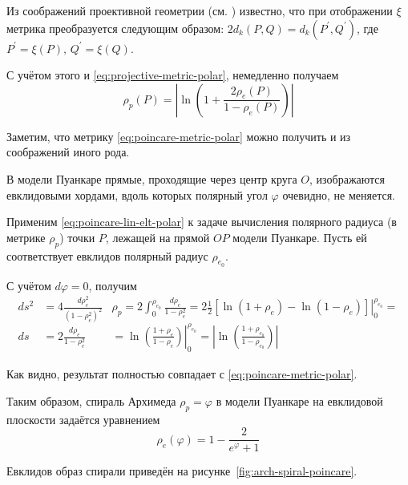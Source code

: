 \documentclass{article}
\numberwithin{equation}{section}
\renewcommand{\phi}{\varphi}
\providecommand{\abs}[1]{\left \lvert{#1}\right \rvert}
\begin{document}


Из соображений проективной геометрии (см. \cite{prasolov04}) известно,
что при отображении $\xi$ метрика преобразуется следующим образом:
$2d_k(P,Q) = d_k(P^\prime, Q^\prime)$, где $P^\prime=\xi(P),\,Q^\prime=\xi(Q)$.

С учётом этого и \eqref{eq:projective-metric-polar}, немедленно получаем
\begin{equation}\label{eq:poincare-metric-polar}
 \rho_p(P) = \abs{\ln\left(1+\frac{2\rho_e(P)}{1-\rho_e(P)}\right)}  
\end{equation}

Заметим, что метрику \eqref{eq:poincare-metric-polar} можно
получить и из соображений иного рода.

В модели Пуанкаре прямые, проходящие через центр круга $O$,
изображаются евклидовыми хордами, вдоль которых полярный угол $\phi$
очевидно, не меняется.

Применим \eqref{eq:poincare-lin-elt-polar} к задаче вычисления
полярного радиуса (в метрике $\rho_p$) точки $P$, лежащей на прямой
$OP$ модели Пуанкаре. Пусть ей соответствует евклидов полярный радиус
$\rho_{e_0}$.

С учётом $d\phi=0$, получим
\begin{subequations}
  \begin{equation*}
    \begin{split}
      ds^2&=4\frac{d\rho_e^2}{(1-\rho_e^2)^2} \\
      ds &= 2\frac{d\rho_e}{1-\rho_e^2} \\
    \end{split}
  \end{equation*}
  \begin{multline*}
    \rho_p = 2\int_0^{\rho_{e_0}} \frac{d\rho_e}{1-\rho_e^2} =
     2 \frac{1}{2} \left . \left [ \ln(1+\rho_e) - \ln(1-\rho_e)
       \right ] \right \rvert_0^{\rho_{e_0}} = \\
     = \left . \ln{\left( \frac{1+\rho_e}{1-\rho_e} \right)} \right
     \rvert_0^{\rho_{e_0}} =
     \abs{ \ln{\left(\frac{1+\rho_{e_0}}{1-\rho_{e_0}} \right)}}
  \end{multline*}
\end{subequations}

Как видно, результат полностью совпадает с
\eqref{eq:poincare-metric-polar}.

Таким образом, спираль Архимеда $\rho_p = \phi$ в модели Пуанкаре на
евклидовой плоскости задаётся уравнением
\begin{equation}\label{eq:arch-spiral-poincare}
  \rho_e(\phi) = 1 - \frac{2}{e^\phi+1}
\end{equation}



Евклидов образ спирали приведён на рисунке \ref{fig:arch-spiral-poincare}.

\clearpage


\end{document}
